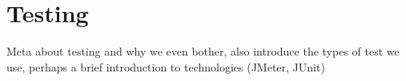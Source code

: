 \section{Testing}
Meta about testing and why we even bother, also introduce the types of test we use, perhaps a brief introduction to technologies (JMeter, JUnit)
